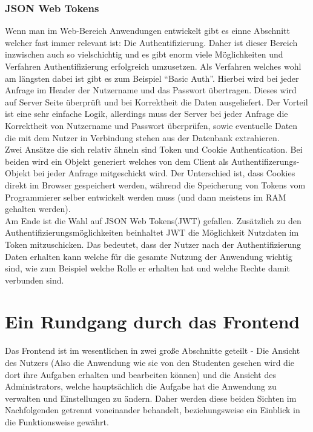 \subsection{JSON Web Tokens} \label{JWT}

Wenn man im Web-Bereich Anwendungen entwickelt gibt es einne Abschnitt welcher fast immer relevant ist: Die Authentifizierung. Daher ist dieser Bereich inzwischen auch so vielschichtig und es gibt enorm viele Möglichkeiten und Verfahren Authentifizierung erfolgreich umzusetzen. Als Verfahren welches wohl am längsten dabei ist gibt es zum Beispiel ``Basic Auth''. Hierbei wird bei jeder Anfrage im Header der Nutzername und das Passwort übertragen. Dieses wird auf Server Seite überprüft und bei Korrektheit die Daten ausgeliefert. Der Vorteil ist eine sehr einfache Logik, allerdings muss der Server bei jeder Anfrage die Korrektheit von Nutzername und Passwort überprüfen, sowie eventuelle Daten die mit dem Nutzer in Verbindung stehen aus der Datenbank extrahieren. \\

Zwei Ansätze die sich relativ ähneln sind Token und Cookie Authentication. Bei beiden wird ein Objekt generiert welches von dem Client als Authentifizerungs-Objekt bei jeder Anfrage mitgeschickt wird. Der Unterschied ist, dass Cookies direkt im Browser gespeichert werden, während die Speicherung von Tokens vom Programmierer selber entwickelt werden muss (und dann meistens im RAM gehalten werden). \\

Am Ende ist die Wahl auf JSON Web Tokens(JWT) gefallen. Zusätzlich zu den Authentifizierungsmöglichkeiten beinhaltet JWT die Möglichkeit Nutzdaten im Token mitzuschicken. Das bedeutet, dass der Nutzer nach der Authentifizierung Daten erhalten kann welche für die gesamte Nutzung der Anwendung wichtig sind, wie zum Beispiel welche Rolle er erhalten hat und welche Rechte damit verbunden sind. 

\chapter{Ein Rundgang durch das Frontend}

Das Frontend ist im wesentlichen in zwei große Abschnitte geteilt - Die Ansicht des Nutzers (Also die Anwendung wie sie von den Studenten gesehen wird die dort ihre Aufgaben erhalten und bearbeiten können) und die Ansicht des Administrators, welche hauptsächlich die Aufgabe hat die Anwendung zu verwalten und Einstellungen zu ändern. Daher werden diese beiden Sichten im Nachfolgenden getrennt voneinander behandelt, beziehungsweise ein Einblick in die Funktionsweise gewährt.

